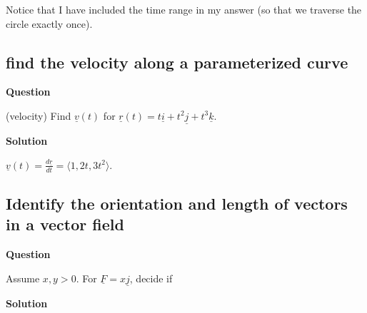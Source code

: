 \documentclass[12pt,letterpaper,noanswers]{exam}
\newcommand{\mb}[1]{\underline{#1}}
\begin{document}
Notice that I have included the time range in my answer (so that we traverse the circle exactly once).


\subsection{find the velocity along a parameterized curve}
\noindent\textbf{Question}

(velocity) Find $\mb v(t)$ for $\mb{r}(t) = t\mb i + t^2\mb j + t^3\mb k$.

\noindent\textbf{Solution}

$\mb v(t) = \frac{d\mb r}{dt} = \langle 1,2t,3t^2\rangle$.

\subsection{Identify the orientation and length of vectors in a vector field}
\noindent\textbf{Question}

\begin{questions}
\question Assume $x,y>0$.  For $\mb F = x\mb j$, decide if
\end{questions}

\noindent\textbf{Solution}
\end{document}
